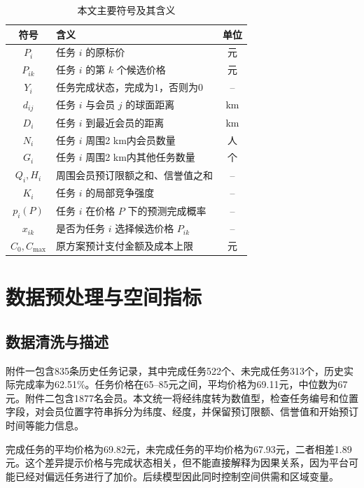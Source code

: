 ﻿\documentclass[UTF8,zihao=-4,a4paper,fontset=fandol]{ctexart}
\begin{document}
\begin{table}[H]
  \centering
  \caption{本文主要符号及其含义}
  \label{tab:symbols}
  \begin{tabular}{clc}
    \toprule
    符号 & 含义 & 单位 \\
    \midrule
    $P_i$ & 任务 $i$ 的原标价 & 元 \\
    $P_{ik}$ & 任务 $i$ 的第 $k$ 个候选价格 & 元 \\
    $Y_i$ & 任务完成状态，完成为1，否则为0 & -- \\
    $d_{ij}$ & 任务 $i$ 与会员 $j$ 的球面距离 & km \\
    $D_i$ & 任务 $i$ 到最近会员的距离 & km \\
    $N_i$ & 任务 $i$ 周围2 km内会员数量 & 人 \\
    $G_i$ & 任务 $i$ 周围2 km内其他任务数量 & 个 \\
    $Q_i,H_i$ & 周围会员预订限额之和、信誉值之和 & -- \\
    $K_i$ & 任务 $i$ 的局部竞争强度 & -- \\
    $p_i(P)$ & 任务 $i$ 在价格 $P$ 下的预测完成概率 & -- \\
    $x_{ik}$ & 是否为任务 $i$ 选择候选价格 $P_{ik}$ & -- \\
    $C_0,C_{\max}$ & 原方案预计支付金额及成本上限 & 元 \\
    \bottomrule
  \end{tabular}
\end{table}

\section{数据预处理与空间指标}

\subsection{数据清洗与描述}

附件一包含835条历史任务记录，其中完成任务522个、未完成任务313个，历史实际完成率为62.51\%。任务价格在65--85元之间，平均价格为69.11元，中位数为67元。附件二包含1877名会员。本文统一将经纬度转为数值型，检查任务编号和位置字段，对会员位置字符串拆分为纬度、经度，并保留预订限额、信誉值和开始预订时间等能力信息。

完成任务的平均价格为69.82元，未完成任务的平均价格为67.93元，二者相差1.89元。这个差异提示价格与完成状态相关，但不能直接解释为因果关系，因为平台可能已经对偏远任务进行了加价。后续模型因此同时控制空间供需和区域变量。
\end{document}
